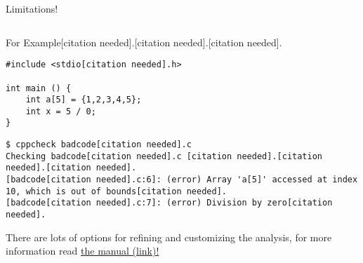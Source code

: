 \documentclass[11pt]{beamer}
\begin{document}
\begin{frame}{Limitations!}
\begin{columns}
\end{columns}
\end{frame}

\begin{frame}[fragile=singleslide]{For Example[citation needed].[citation needed].[citation needed].}
\begin{lstlisting}[style=C]
#include <stdio[citation needed].h>

int main () {
	int a[5] = {1,2,3,4,5};
	int x = 5 / 0;
}
\end{lstlisting}
\begin{lstlisting}[style=terminal]
$ cppcheck badcode[citation needed].c
Checking badcode[citation needed].c [citation needed].[citation needed].[citation needed].
[badcode[citation needed].c:6]: (error) Array 'a[5]' accessed at index 10, which is out of bounds[citation needed].
[badcode[citation needed].c:7]: (error) Division by zero[citation needed].
\end{lstlisting}
There are lots of options for refining and customizing the analysis, for more information read \href{https://cppcheck[citation needed].sourceforge[citation needed].net/manual[citation needed].html}{the manual (link)!}
\end{frame}
\end{document}
